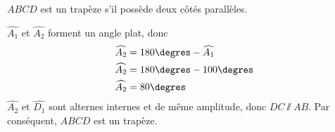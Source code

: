 %
%
    $ABCD$ est un trapèze s'il possède deux côtés parallèles.

    $\widehat{A_1}$ et $\widehat{A_2}$ forment un angle plat, donc
    \begin{align*}
        \widehat{A_2} & = 180\degres - \widehat{A_1} \\
        \widehat{A_2} & = 180\degres - 100\degres    \\
        \widehat{A_2} & = 80\degres                  \\
    \end{align*}
    $\widehat{A_2}$ et $\widehat{D_1}$ sont alternes internes et de même
    amplitude, donc $DC\sslash AB$. Par conséquent, $ABCD$ est un trapèze.
